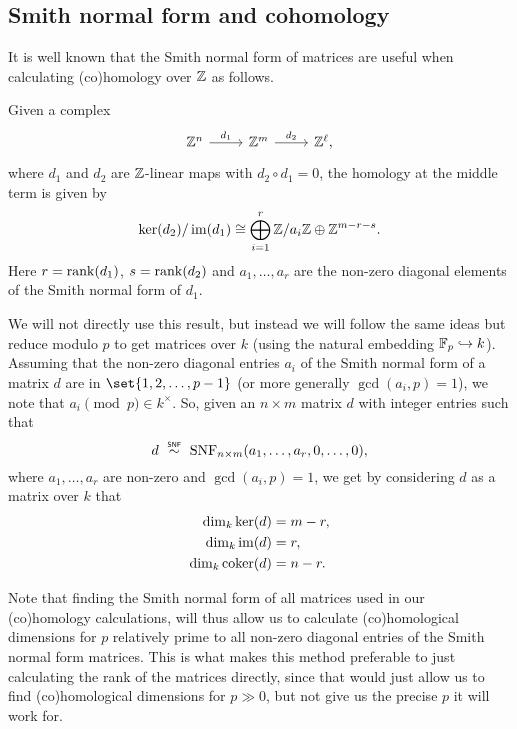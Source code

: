 \subsection{Smith normal form and cohomology}%
\label{subsec:SNF-coh}

It is well known that the Smith normal form of matrices are useful when calculating (co)homology over $\mathbb{Z}$ as follows.

\begin{fact}\label{fact:SNF-Z-coh}
  Given a complex
  \[
    \begin{tikzcd}
      \Z^{n} \ar[r,"d_{1}"] & \Z^{m} \ar[r,"d_{2}"] & \Z^{\ell},
    \end{tikzcd}
  \]
  where $d_{1}$ and $d_{2}$ are $\mathbb{Z}$-linear maps with $d_{2} \circ d_{1} = 0$, the homology at the middle term is given by
  \begin{equation*}
    \operatorname{ker}(d_{2})/\operatorname{im}(d_{1}) \cong \bigoplus_{i=1}^{r} \mathbb{Z}/a_{i}\mathbb{Z} \oplus \mathbb{Z}^{m-r-s}.
  \end{equation*}
  Here $r = \operatorname{rank}(d_{1})$, $s = \operatorname{rank}(d_{2})$ and $a_{1},\dotsc,a_{r}$ are the non-zero diagonal elements of the Smith normal form of $d_{1}$.
\end{fact}

We will not directly use this result, but instead we will follow the same ideas but reduce modulo $p$ to get matrices over $k$ (using the natural embedding $\mathbb{F}_{p} \hookrightarrow k$). Assuming that the non-zero diagonal entries $a_{i}$ of the Smith normal form of a matrix $d$ are in $\set{1,2,\dotsc,p-1}$ (or more generally $\gcd(a_{i},p) = 1$), we note that $a_{i} \pmod{p} \in k^{\times}$. So, given an $n \times m$ matrix $d$ with integer entries such that
\begin{equation*}
  d \snfsim \SNF_{n \times m}(a_{1},\dotsc,a_{r},0,\dotsc,0),
\end{equation*}
where $a_{1},\dotsc,a_{r}$ are non-zero and $\gcd(a_{i},p) = 1$, we get by considering $d$ as a matrix over $k$ that
\begin{equation}
  \label{eq:snf-dims}
  \begin{aligned}
    \dim_{k} \operatorname{ker}(d) &= m-r, \\
    \dim_{k} \operatorname{im}(d) &= r, \\
    \dim_{k} \operatorname{coker}(d) &= n-r.
  \end{aligned}
\end{equation}

\begin{remark}
  Note that finding the Smith normal form of all matrices used in our (co)homology calculations, will thus allow us to calculate (co)homological dimensions for $p$ relatively prime to all non-zero diagonal entries of the Smith normal form matrices. This is what makes this method preferable to just calculating the rank of the matrices directly, since that would just allow us to find (co)homological dimensions for $p \gg 0$, but not give us the precise $p$ it will work for.
\end{remark}


